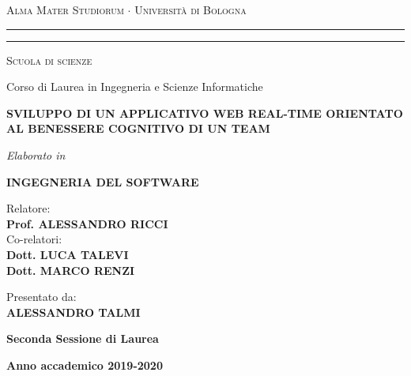 \begin{titlepage}

  \begin{center}
  {{\Large{\textsc{Alma Mater Studiorum $\cdot$ Universit\`a di Bologna}}}}
  \rule[0.1cm]{15.8cm}{0.1mm}
  \rule[0.5cm]{15.8cm}{0.6mm}
  {{\textsc{Scuola di scienze}}}
  
  {{Corso di Laurea in Ingegneria e Scienze Informatiche}}
  \end{center}
  \vspace{24mm}

  \begin{center}
  \huge\bf SVILUPPO DI UN APPLICATIVO WEB REAL-TIME ORIENTATO AL BENESSERE COGNITIVO DI UN TEAM
  
  \end{center}
  
  \vspace{14mm}
  \begin{center}
  {{\emph{Elaborato in}}}
  
  \vspace{1mm}
  {{\bf{INGEGNERIA DEL SOFTWARE}}}
  \vspace{18mm}
  \end{center}
  
  \noindent
  \begin{minipage}[t]{0.47\textwidth}
    {\large{Relatore:}\\
    \setlength\parindent{12pt}\bf Prof. ALESSANDRO RICCI\\
    }
    {\large{Co-relatori:}\\
      \setlength\parindent{12pt}\bf Dott. LUCA TALEVI\\
      \setlength\parindent{12pt}\bf Dott. MARCO RENZI\\
    }
  \end{minipage}
  \hfill
  \begin{minipage}[t]{0.47\textwidth}\raggedleft
    {\large{Presentato da:}\\
    \setlength\parindent{12pt}\bf ALESSANDRO TALMI\\
    }
  \end{minipage}

  \vspace{20mm}
  \begin{center}
  {{\bf{Seconda Sessione di Laurea}}}
  
  \vspace{1mm}
  {{\bf{Anno accademico 2019-2020}}}
  \end{center}
  
\end{titlepage}
